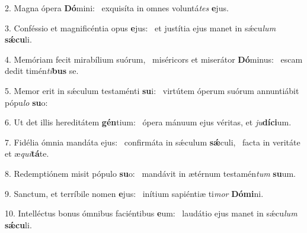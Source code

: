 2. Magna ópera \textbf{Dó}mini: \ast\  exquisíta in omnes voluntá\textit{tes} \textbf{e}jus.\

3. Conféssio et magnificéntia opus \textbf{e}jus: \ast\  et justítia ejus manet in sǽcu\textit{lum} \textbf{sǽ}\textbf{cu}li.\

4. Memóriam fecit mirabílium suórum, \dag\  miséricors et miserátor \textbf{Dó}minus: \ast\  escam dedit timén\textit{ti}\textbf{bus} se.\

5. Memor erit in sǽculum testaménti \textbf{su}i: \ast\  virtútem óperum suórum annuntiábit pópu\textit{lo} \textbf{su}o:\

6. Ut det illis hereditátem \textbf{gén}tium: \ast\  ópera mánuum ejus véritas, et \textit{ju}\textbf{dí}\textbf{ci}um.\

7. Fidélia ómnia mandáta ejus: \dag\  confirmáta in sǽculum \textbf{sǽ}culi, \ast\  facta in veritáte et æ\textit{qui}\textbf{tá}te.\

8. Redemptiónem misit pópulo \textbf{su}o: \ast\  mandávit in ætérnum testamén\textit{tum} \textbf{su}um.\

9. Sanctum, et terríbile nomen \textbf{e}jus: \ast\  inítium sapiéntiæ ti\textit{mor} \textbf{Dó}\textbf{mi}ni.\

10. Intelléctus bonus ómnibus faciéntibus \textbf{e}um: \ast\  laudátio ejus manet in sǽcu\textit{lum} \textbf{sǽ}\textbf{cu}li.\

